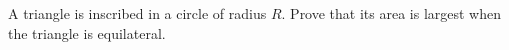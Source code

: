 A triangle is inscribed in a circle of radius $R$. Prove that its area is largest when the triangle is equilateral.
